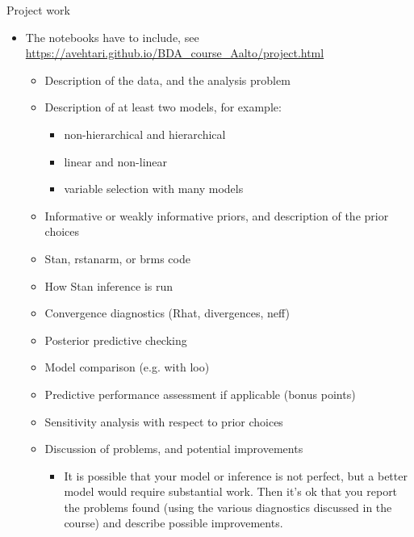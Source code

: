 \documentclass[t]{beamer}
\begin{document}
\begin{frame}
  
  {\Large\color{navyblue} Project work}

  \begin{itemize}
  \item The notebooks have to include, see \url{https://avehtari.github.io/BDA_course_Aalto/project.html}
    \begin{itemize}
    \item Description of the data, and the analysis problem
    \item Description of at least two models, for example:
      \begin{itemize}
      \item non-hierarchical and hierarchical
      \item linear and non-linear
      \item variable selection with many models
    \end{itemize}
    \item Informative or weakly informative priors, and description of the prior choices
    \item Stan, rstanarm, or brms code
    \item How Stan inference is run
    \item Convergence diagnostics (Rhat, divergences, neff)
    \item Posterior predictive checking
    \item Model comparison (e.g. with loo)
    \item Predictive performance assessment if applicable (bonus points)
    \item Sensitivity analysis with respect to prior choices
    \item Discussion of problems, and potential improvements 
      \begin{itemize}
      \item It is possible that your model or inference is not perfect, but a better model would require substantial work. Then it's ok that you report the problems found (using the various diagnostics discussed in the course) and describe possible improvements.
      \end{itemize}
    \end{itemize}
  \end{itemize}
\end{frame}
\end{document}
